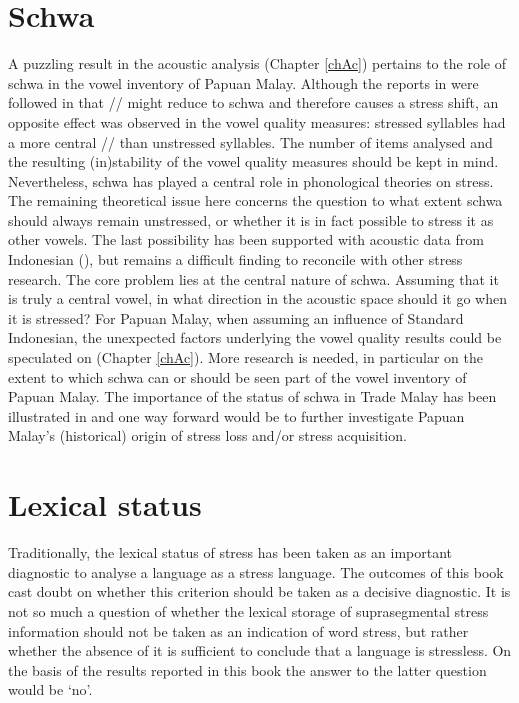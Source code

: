 \section{Schwa}
A puzzling result in the acoustic analysis (Chapter \ref{chAc}) pertains to the role of schwa in the vowel inventory of Papuan Malay. Although the reports in \citet{kluge_grammar_2017} were followed in that // might reduce to schwa and therefore causes a stress shift, an opposite effect was observed in the vowel quality measures: stressed syllables had a more central // than unstressed syllables. The number of items analysed and the resulting (in)stability of the vowel quality measures should be kept in mind. Nevertheless, schwa has played a central role in phonological theories on stress. The remaining theoretical issue here concerns the question to what extent schwa should always remain unstressed, or whether it is in fact possible to stress it as other vowels. The last possibility has been supported with acoustic data from Indonesian (\citealt{laksman_location_1994}), but remains a difficult finding to reconcile with other stress research. The core problem lies at the central nature of schwa. Assuming that it is truly a central vowel, in what direction in the acoustic space should it go when it is stressed? For Papuan Malay, when assuming an influence of Standard Indonesian, the unexpected factors underlying the vowel quality results could be speculated on (Chapter \ref{chAc}). More research is needed, in particular on the extent to which schwa can or should be seen part of the vowel inventory of Papuan Malay. The importance of the status of schwa in Trade Malay has been illustrated in \citet{paauw_malay_2009} and one way forward would be to further investigate Papuan Malay's (historical) origin of stress loss and/or stress acquisition.\par

\section{Lexical status}
Traditionally, the lexical status of stress has been taken as an important diagnostic to analyse a language as a stress language. The outcomes of this book cast doubt on whether this criterion should be taken as a decisive diagnostic. It is not so much a question of whether the lexical storage of suprasegmental stress information should not be taken as an indication of word stress, but rather whether the absence of it is sufficient to conclude that a language is stressless. On the basis of the results reported in this book the answer to the latter question would be `no'. \par

